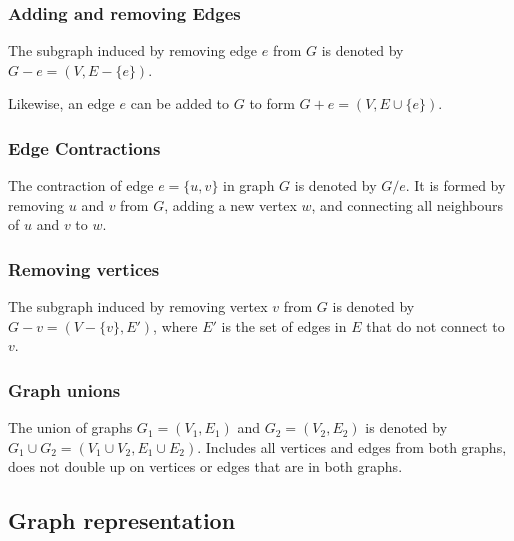 \subsubsection{Adding and removing Edges}

The subgraph induced by removing edge $e$ from $G$ is denoted by $G - e = (V,E-\{e\})$.

Likewise, an edge $e$ can be added to $G$ to form $G + e = (V, E \cup \{e\})$.

\subsubsection{Edge Contractions}
The contraction of edge $e = \{u,v\}$ in graph $G$ is denoted by $G/e$. 
It is formed by removing $u$ and $v$ from $G$, adding a new vertex $w$, and connecting all neighbours of $u$ and $v$ to $w$. \\


\subsubsection{Removing vertices}
The subgraph induced by removing vertex $v$ from $G$ is denoted by $G - v = (V-\{v\}, E')$, where $E'$ is the set of edges in $E$ that do not connect to $v$.

\subsubsection{Graph unions}
The union of graphs $G_1=(V_1,E_1)$ and $G_2=(V_2,E_2)$ is denoted by $G_1 \cup G_2 = (V_1 \cup V_2, E_1 \cup E_2)$. Includes all vertices and edges from both graphs, does not double up on vertices or edges that are in both graphs.

\subsection{Graph representation}
